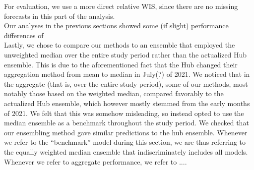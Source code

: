 For evaluation, we use a more direct relative WIS, since there are no missing forecasts in this part of the analysis.\\
Our analyses in the previous sections showed some (if slight) performance differences of  \\
Lastly, we chose to compare our methods to an ensemble that employed the unweighted median over the entire study period rather than the actualized Hub ensemble. This is due to the aforementioned fact that the Hub changed their aggregation method from mean to median in July(?) of 2021. We noticed that in the aggregate (that is, over the entire study period), some of our methods, most notably those based on the weighted median, compared favorably to the actualized Hub ensemble, which however mostly stemmed from the early months of 2021. We felt that this was somehow misleading, so instead opted to use the median ensemble as a benchmark throughout the study period. We checked that our ensembling method gave similar predictions to the hub ensemble. Whenever we refer to the ``benchmark'' model during this section, we are thus referring to the equally weighted median ensemble that indiscriminately includes all models. Whenever we refer to aggregate performance, we refer to .... \\

